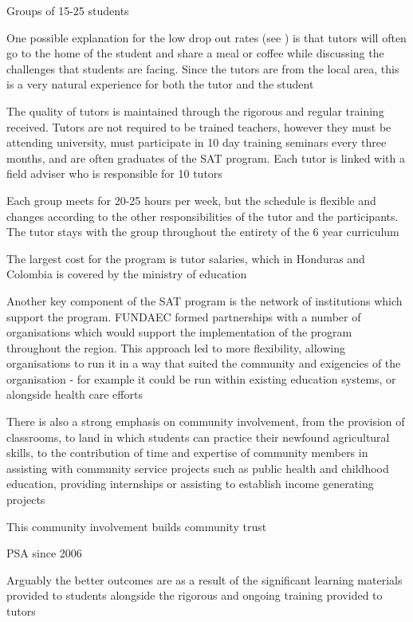Groups of 15-25 students \citep{Kwauk2016}

One possible explanation for the low drop out rates (see \cite{Marshall2014}) is that tutors will often go to the home of the student and share a meal or coffee while discussing the challenges that students are facing. Since the tutors are from the local area, this is a very natural experience for both the tutor and the student \citep{Kwauk2016}

The quality of tutors is maintained through the rigorous and regular training received. Tutors are not required to be trained teachers, however they must be attending university, must participate in 10 day training seminars every three months, and are often graduates of the SAT program. Each tutor is linked with a field adviser who is responsible for 10 tutors \citep{Kwauk2016}

Each group meets for 20-25 hours per week, but the schedule is flexible and changes according to the other responsibilities of the tutor and the participants. The tutor stays with the group throughout the entirety of the 6 year curriculum \citep{Kwauk2016}

The largest cost for the program is tutor salaries, which in Honduras and Colombia is covered by the ministry of education \citep{Kwauk2016}


Another key component of the SAT program is the network of institutions which support the program. FUNDAEC formed partnerships with a number of organisations which would support the implementation of the program throughout the region. This approach led to more flexibility, allowing organisations to run it in a way that suited the community and exigencies of the organisation - for example it could be run within existing education systems, or alongside health care efforts \citep{Kwauk2016}

There is also a strong emphasis on community involvement, from the provision of classrooms, to land in which students can practice their newfound agricultural skills, to the contribution of time and expertise of community members in assisting with community service projects such as public health and childhood education, providing internships or assisting to establish income generating projects \citep{Kwauk2016}

This community involvement builds community trust \citep{Kwauk2016} %

PSA since 2006 \citep{Kwauk2016}

Arguably the better outcomes are as a result of the significant learning materials provided to students alongside the rigorous and ongoing training provided to tutors \citep{Kwauk2016}

